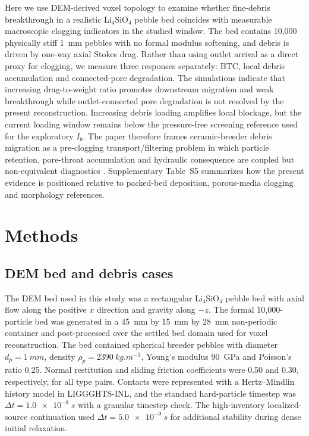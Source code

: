 \documentclass[preprint,12pt,authoryear]{elsarticle}
\newcommand{\LiSi}{Li$_4$SiO$_4$\xspace}
\newcommand{\BTC}{BTC\xspace}
\newcommand{\Ib}{$I_b$\xspace}
\begin{document}
Here we use DEM-derived voxel topology to examine whether fine-debris breakthrough in a realistic \LiSi pebble bed coincides with measurable macroscopic clogging indicators in the studied window. The bed contains 10,000 physically stiff \SI{1}{mm} pebbles with no formal modulus softening, and debris is driven by one-way axial Stokes drag. Rather than using outlet arrival as a direct proxy for clogging, we measure three responses separately: \BTC, local debris accumulation and connected-pore degradation. The simulations indicate that increasing drag-to-weight ratio promotes downstream migration and weak breakthrough while outlet-connected pore degradation is not resolved by the present reconstruction. Increasing debris loading amplifies local blockage, but the current loading window remains below the pressure-free screening reference used for the exploratory \Ib. The paper therefore frames ceramic-breeder debris migration as a pre-clogging transport/filtering problem in which particle retention, pore-throat accumulation and hydraulic consequence are coupled but non-equivalent diagnostics \citep{Natsui2012FinesClogging,Boccardo2019PackedBedDeposition,Mays2005Clogging,Dressaire2017Clogging,Parvan2020Clogging}. Supplementary Table~S5 summarizes how the present evidence is positioned relative to packed-bed deposition, porous-media clogging and morphology references.

\section{Methods}

\subsection{DEM bed and debris cases}

The DEM bed used in this study was a rectangular \LiSi pebble bed with axial flow along the positive $x$ direction and gravity along $-z$. The formal 10,000-particle bed was generated in a \SI{45}{mm} by \SI{15}{mm} by \SI{28}{mm} non-periodic container and post-processed over the settled bed domain used for voxel reconstruction. The bed contained spherical breeder pebbles with diameter $d_p = \SI{1}{mm}$, density $\rho_p=\SI{2390}{kg.m^{-3}}$, Young's modulus \SI{90}{GPa} and Poisson's ratio 0.25. Normal restitution and sliding friction coefficients were 0.50 and 0.30, respectively, for all type pairs. Contacts were represented with a Hertz--Mindlin history model in LIGGGHTS-INL, and the standard hard-particle timestep was $\Delta t=\SI{1.0e-8}{s}$ with a granular timestep check. The high-inventory localized-source continuation used $\Delta t=\SI{5.0e-9}{s}$ for additional stability during dense initial relaxation.
\end{document}

